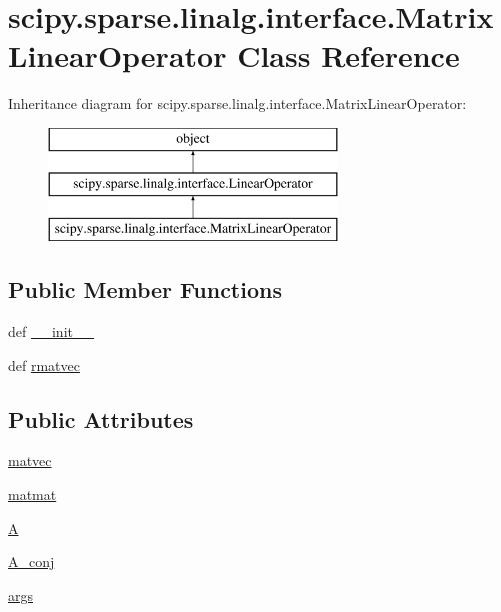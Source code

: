 \hypertarget{classscipy_1_1sparse_1_1linalg_1_1interface_1_1MatrixLinearOperator}{}\section{scipy.\+sparse.\+linalg.\+interface.\+Matrix\+Linear\+Operator Class Reference}
\label{classscipy_1_1sparse_1_1linalg_1_1interface_1_1MatrixLinearOperator}
Inheritance diagram for scipy.\+sparse.\+linalg.\+interface.\+Matrix\+Linear\+Operator\+:\begin{figure}[H]
\begin{center}
\leavevmode
\includegraphics[height=3.000000cm]{classscipy_1_1sparse_1_1linalg_1_1interface_1_1MatrixLinearOperator}
\end{center}
\end{figure}
\subsection*{Public Member Functions}
\begin{DoxyCompactItemize}
\item 
def \hyperlink{classscipy_1_1sparse_1_1linalg_1_1interface_1_1MatrixLinearOperator_ab21de731976087fc303d6de29dd6fd00}{\+\_\+\+\_\+init\+\_\+\+\_\+}
\item 
def \hyperlink{classscipy_1_1sparse_1_1linalg_1_1interface_1_1MatrixLinearOperator_a2ae83907b2d7b300dffb43441df9adb1}{rmatvec}
\end{DoxyCompactItemize}
\subsection*{Public Attributes}
\begin{DoxyCompactItemize}
\item 
\hyperlink{classscipy_1_1sparse_1_1linalg_1_1interface_1_1MatrixLinearOperator_a93edeb0c84ee1fde10f76531c8e2839c}{matvec}
\item 
\hyperlink{classscipy_1_1sparse_1_1linalg_1_1interface_1_1MatrixLinearOperator_a85a09d2f506ba780bfdd92725447c317}{matmat}
\item 
\hyperlink{classscipy_1_1sparse_1_1linalg_1_1interface_1_1MatrixLinearOperator_a57e675863254c554a3dba542932cddf7}{A}
\item 
\hyperlink{classscipy_1_1sparse_1_1linalg_1_1interface_1_1MatrixLinearOperator_a3829a3ade8fdd8b8d9cb23b59b991804}{A\+\_\+conj}
\item 
\hyperlink{classscipy_1_1sparse_1_1linalg_1_1interface_1_1MatrixLinearOperator_abd010b8fafabb89f5fe05a62cc98ac76}{args}
\end{DoxyCompactItemize}


